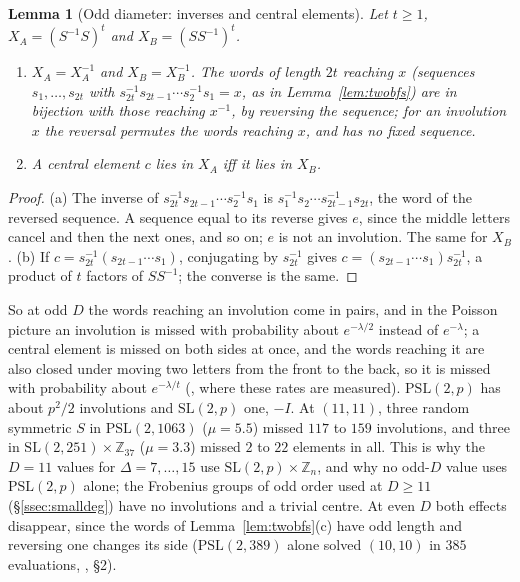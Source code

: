 \documentclass[11pt]{amsart}
\newtheorem{lemma}[theorem]{Lemma}
\theoremstyle{definition}
\theoremstyle{remark}
\begin{document}
\begin{lemma}[Odd diameter: inverses and central elements]\label{lem:oddholes}
Let $t\ge1$, $X_A=(S^{-1}S)^t$ and $X_B=(SS^{-1})^t$.
\begin{enumerate}[label=\textup{(\alph*)}]
\item $X_A=X_A^{-1}$ and $X_B=X_B^{-1}$. The words of length $2t$ reaching $x$ (sequences $s_1,\dots,s_{2t}$ with $s_{2t}^{-1}s_{2t-1}\cdots s_2^{-1}s_1=x$, as in Lemma~\textup{\ref{lem:twobfs}}) are in bijection with those reaching $x^{-1}$, by reversing the sequence; for an involution $x$ the reversal permutes the words reaching $x$, and has no fixed sequence.
\item A central element $c$ lies in $X_A$ iff it lies in $X_B$.
\end{enumerate}
\end{lemma}

\begin{proof}
(a) The inverse of $s_{2t}^{-1}s_{2t-1}\cdots s_2^{-1}s_1$ is $s_1^{-1}s_2\cdots s_{2t-1}^{-1}s_{2t}$, the word of the reversed sequence. A sequence equal to its reverse gives $e$, since the middle letters cancel and then the next ones, and so on; $e$ is not an involution. The same for $X_B$. (b) If $c=s_{2t}^{-1}(s_{2t-1}\cdots s_1)$, conjugating by $s_{2t}^{-1}$ gives $c=(s_{2t-1}\cdots s_1)s_{2t}^{-1}$, a product of $t$ factors of $SS^{-1}$; the converse is the same.
\end{proof}

So at odd $D$ the words reaching an involution come in pairs, and in the Poisson picture an involution is missed with probability about $e^{-\lambda/2}$ instead of $e^{-\lambda}$; a central element is missed on both sides at once, and the words reaching it are also closed under moving two letters from the front to the back, so it is missed with probability about $e^{-\lambda/t}$ (, where these rates are measured). $\mathrm{PSL}(2,p)$ has about $p^2/2$ involutions and $\mathrm{SL}(2,p)$ one, $-I$. At $(11,11)$, three random symmetric $S$ in $\mathrm{PSL}(2,1063)$ ($\mu=5.5$) missed $117$ to $159$ involutions, and three in $\mathrm{SL}(2,251)\times\mathbb{Z}_{37}$ ($\mu=3.3$) missed $2$ to $22$ elements in all. This is why the $D=11$ values for $\Delta=7,\dots,15$ use $\mathrm{SL}(2,p)\times\mathbb{Z}_n$, and why no odd-$D$ value uses $\mathrm{PSL}(2,p)$ alone; the Frobenius groups of odd order used at $D\ge11$ (\S\ref{ssec:smalldeg}) have no involutions and a trivial centre. At even $D$ both effects disappear, since the words of Lemma~\ref{lem:twobfs}(c) have odd length and reversing one changes its side ($\mathrm{PSL}(2,389)$ alone solved $(10,10)$ in $385$ evaluations, , \S2).
\end{document}
